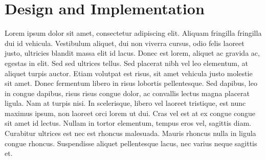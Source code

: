 \section{Design and Implementation}
Lorem ipsum dolor sit amet, consectetur adipiscing elit. Aliquam fringilla fringilla dui id vehicula. Vestibulum aliquet, dui non viverra cursus, odio felis laoreet justo, ultricies blandit massa elit id lacus. Donec est lorem, aliquet ac gravida ac, egestas in elit. Sed sed ultrices tellus. Sed placerat nibh vel leo elementum, at aliquet turpis auctor. Etiam volutpat est risus, sit amet vehicula justo molestie sit amet. Donec fermentum libero in risus lobortis pellentesque. Sed dapibus, leo in congue dapibus, risus risus congue dolor, ac convallis lectus magna placerat ligula. Nam at turpis nisi. In scelerisque, libero vel laoreet tristique, est nunc maximus ipsum, non laoreet orci lorem ut dui. Cras vel est at ex congue congue sit amet id lectus. Nullam in tortor elementum, tempus eros vel, sagittis diam. Curabitur ultrices est nec est rhoncus malesuada. Mauris rhoncus nulla in ligula congue rhoncus. Suspendisse aliquet pellentesque lacus, nec varius neque sagittis et.


